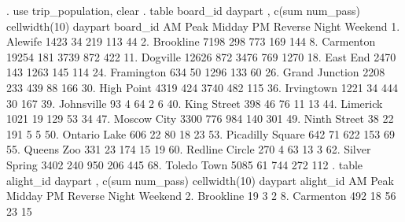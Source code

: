 . use trip_population, clear
{\smallskip}
. table board_id daypart , c(sum num_pass) cellwidth(10)
{\smallskip}
                     {\VBAR}                          daypart                          
            board_id {\VBAR}    AM Peak      Midday  PM Reverse       Night     Weekend
          1. Alewife {\VBAR}       1423          34         219         113          44
        2. Brookline {\VBAR}       7198         298         773         169         144
        8. Carmenton {\VBAR}      19254         181        3739         872         422
        11. Dogville {\VBAR}      12626         872        3476         769        1270
        18. East End {\VBAR}       2470         143        1263         145         114
      24. Framington {\VBAR}        634          50        1296         133          60
  26. Grand Junction {\VBAR}       2208         233         439          88         166
      30. High Point {\VBAR}       4319         424        3740         482         115
      36. Irvingtown {\VBAR}       1221          34         444          30         167
      39. Johnsville {\VBAR}         93           4          64           2           6
     40. King Street {\VBAR}        398          46          76          11          13
        44. Limerick {\VBAR}       1021          19         129          53          34
     47. Moscow City {\VBAR}       3300         776         984         140         301
    49. Ninth Street {\VBAR}         38          22         191           5           5
    50. Ontario Lake {\VBAR}        606          22          80          18          23
53. Picadilly Square {\VBAR}        642          71         622         153          69
      55. Queens Zoo {\VBAR}        331          23         174          15          19
  60. Redline Circle {\VBAR}        270           4          63          13           3
   62. Silver Spring {\VBAR}       3402         240         950         206         445
     68. Toledo Town {\VBAR}       5085          61         744         272         112
{\smallskip}
. table alight_id daypart , c(sum num_pass) cellwidth(10)
{\smallskip}
                     {\VBAR}                          daypart                          
           alight_id {\VBAR}    AM Peak      Midday  PM Reverse       Night     Weekend
        2. Brookline {\VBAR}         19                       3           2            
        8. Carmenton {\VBAR}        492          18          56          23          15
